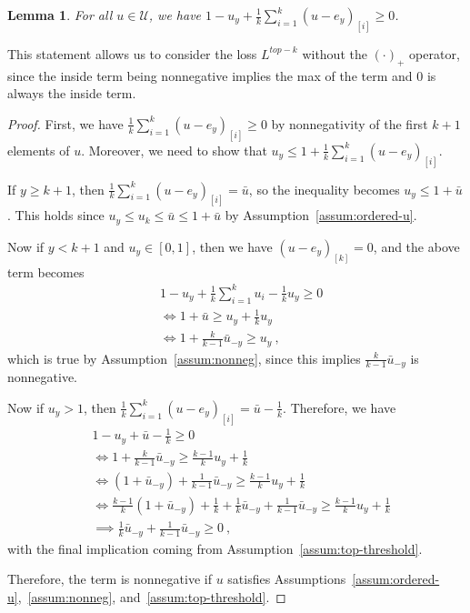 \documentclass[12pt]{article}
\newcommand{\U}{\mathcal{U}}
\newtheorem{lemma}{Lemma}
\begin{document}
\begin{lemma}\label{lem:get-rid-max-op}
	For all $u \in \U$, we have $1 -u_y + \frac{1}{k} \sum_{i=1}^k (u - e_y)_{[i]} \geq 0$.
\end{lemma}
This statement allows us to consider the loss $L^{top-k}$ without the $(\cdot)_+$ operator, since the inside term being nonnegative implies the max of the term and $0$ is always the inside term.
\begin{proof}
	First, we have $\frac 1 k \sum_{i=1}^k (u-e_y)_{[i]} \geq 0$ by nonnegativity of the first $k+1$ elements of $u$.
	Moreover, we need to show that $u_y \leq 1 + \frac 1 k \sum_{i=1}^k (u-e_y)_{[i]}$.
	
	If $y \geq k+1$, then $\frac 1 k \sum_{i=1}^k (u-e_y)_{[i]} = \bar u$, so the inequality becomes $u_y \leq 1 + \bar u$.
	This holds since $u_y \leq u_k \leq \bar u \leq 1 + \bar u$ by Assumption~\ref{assum:ordered-u}.
	
	Now if $y < k+1$ and $u_y \in [0,1]$, then we have $(u-e_y)_{[k]} = 0$, and the above term becomes
	\begin{align*}
	&1 -u_y + \frac{1}{k} \sum_{i=1}^{k} u_i - \frac 1 k u_y \geq 0\\
	&\iff 1 + \bar u \geq u_y + \frac{1}{k} u_y\\
	&\iff 1 + \frac k {k-1} \bar u_{-y} \geq u_y~,~
	\end{align*}
	which is true by Assumption~\ref{assum:nonneg}, since this implies $\frac{k}{k-1} \bar u_{-y}$ is nonnegative.
	
	Now if $u_y > 1$, then $\frac 1 k \sum_{i=1}^k (u-e_y)_{[i]} = \bar u - \frac 1 k$.
	Therefore, we have 
	\begin{align*}
	&1 -u_y + \bar u - \frac 1 k \geq 0\\
	&\iff 1 + \frac{k}{k-1}\bar u_{-y} \geq \frac{k-1}{k} u_y + \frac 1 k\\
	&\iff (1 + \bar u_{-y}) + \frac 1 {k-1} \bar u_{-y} \geq \frac{k-1}{k} u_y + \frac 1 k\\
	&\iff \frac{k-1}{k}(1 + \bar u_{-y}) + \frac 1 k + \frac{1}{k}\bar u_{-y} + \frac 1 {k-1} \bar u_{-y} \geq \frac{k-1}{k} u_y + \frac 1 k\\
	&\implies \frac{1}{k}\bar u_{-y}+ \frac{1}{k-1}\bar u_{-y} \geq 0~,~
	\end{align*}
	with the final implication coming from Assumption~\ref{assum:top-threshold}.
	
	Therefore, the term is nonnegative if $u$ satisfies Assumptions~\ref{assum:ordered-u},~\ref{assum:nonneg}, and~\ref{assum:top-threshold}.
\end{proof}
\end{document}
